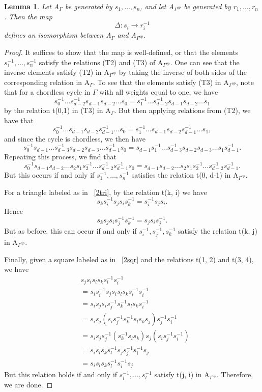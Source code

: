 \documentclass[11pt]{amsart}
\newtheorem{lem}[thm]{Lemma}
\theoremstyle{definition}
\begin{document}
\begin{lem}\label{lem:op_homomorphism}
Let A$_{\Gamma}$ be generated by $s_{1}, \dots, s_{n}$, and let A$_{\Gamma^{op}}$ be generated by $r_{1}, \dots, r_{n}$. Then the map $$\Delta: s_{i} \rightarrow r_{i}^{-1}$$ defines an isomorphism between A$_{\Gamma}$ and A$_{\Gamma^{op}}.$
\end{lem}
\begin{proof}
It suffices to show that the map is well-defined, or that the elements $s_{1}^{-1}, \dots, s_{n}^{-1}$ satisfy the relations (T2) and (T3) of A$_{\Gamma^{op}}$. One can see that the inverse elements satisfy (T2) in A$_{\Gamma^{op}}$ by taking the inverse of both sides of the corresponding relation in A$_{\Gamma}$. To see that the elements satisfy (T3) in A$_{\Gamma^{op}}$, note that for a chordless cycle in $\Gamma$ with all weights equal to one, we have $$s_{0}^{-1}\dots s_{d-2}^{-1}s_{d-1}s_{d-2}\dots s_{0} = s_{1}^{-1}\dots s_{d-2}^{-1}s_{d-1}s_{d-2}\dots s_{1}$$ by the relation t(0,1) in (T3) in A$_{\Gamma}$. But then applying relations from (T2), we have that $$s_{0}^{-1}\dots s_{d-1}s_{d-2}s_{d-1}^{-1}\dots s_{0} = s_{1}^{-1}\dots s_{d-1}s_{d-2}s_{d-1}^{-1}\dots s_{1},$$ and since the cycle is chordless, we then have $$s_{0}^{-1}s_{d-1}\dots s_{d-3}^{-1}s_{d-2}s_{d-3}\dots s_{d-1}^{-1}s_{0} = s_{d-1}s_{1}^{-1}\dots s_{d-3}^{-1}s_{d-2}s_{d-3}\dots s_{1}s_{d-1}^{-1}.$$ Repeating this process, we find that $$s_{0}^{-1}s_{d-1}s_{d-2}\dots s_{2}s_{1}s_{2}^{-1}\dots s_{d-2}^{-1}s_{d-1}^{-1}s_{0} = s_{d-1}s_{d-2}\dots s_{2}s_{1}s_{2}^{-1}\dots s_{d-2}^{-1}s_{d-1}^{-1}.$$ But this occurs if and only if $s_{1}^{-1}, \dots, s_{n}^{-1}$ satisfies the relation t(0, d-1) in A$_{\Gamma^{op}}.$

For a triangle labeled as in ~\ref{2tri}, by the relation t(k, i) we have $$s_{k}s_{i}^{-1}s_{j}s_{i}s_{k}^{-1} = s_{i}^{-1}s_{j}s_{i}.$$ Hence $$s_{k}s_{j}s_{i}s_{j}^{-1}s_{k}^{-1} = s_{j}s_{i}s_{j}^{-1}.$$ But as before, this can occur if and only if $s_{i}^{-1}, s_{j}^{-1}, s_{k}^{-1}$ satisfy the relation t(k, j) in A$_{\Gamma^{op}}$.

Finally, given a square labeled as in ~\ref{2sqr} and the relations t(1, 2) and t(3, 4), we have
\begin{align*}
& s_{j}s_{i}s_{l}s_{k}s_{l}^{-1}s_{i}^{-1} \\
&= s_{i}s_{i}^{-1}s_{j}s_{i}s_{l}s_{k}s_{l}^{-1}s_{i}^{-1} \\
&= s_{i}s_{j}s_{i}s_{j}^{-1}s_{k}^{-1}s_{l}s_{k}s_{i}^{-1} \\
&= s_{i}s_{j}(s_{i}s_{j}^{-1}s_{k}^{-1}s_{l}s_{k}s_{j})s_{j}^{-1}s_{i}^{-1} \\
&= s_{i}s_{j}s_{j}^{-1}(s_{k}^{-1}s_{l}s_{k})s_{j}(s_{i}s_{j}^{-1}s_{i}^{-1}) \\
&= s_{i}s_{l}s_{k}s_{l}^{-1}s_{j}s_{j}^{-1}s_{i}^{-1}s_{j} \\
&= s_{i}s_{l}s_{k}s_{l}^{-1}s_{i}^{-1}s_{j}
\end{align*}
But this relation holds if and only if $s_{i}^{-1}, \dots, s_{l}^{-1}$ satisfy t(j, i) in A$_{\Gamma^{op}}$. Therefore, we are done.
\end{proof}
\end{document}
